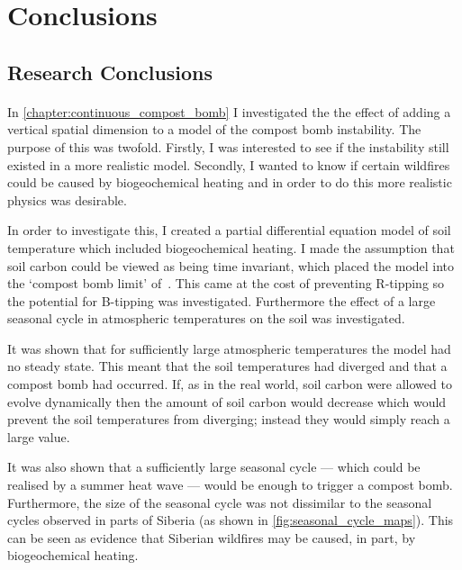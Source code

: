 \chapter{Conclusions}
\graphicspath{{conclusions/figs}}

\section{Research Conclusions}
\subsubsection{}

In \cref{chapter:continuous_compost_bomb} I investigated the the effect of adding a vertical spatial dimension to a model of the compost bomb instability.
The purpose of this was twofold. 
Firstly, I was interested to see if the instability still existed in a more realistic model.
Secondly, I wanted to know if certain wildfires could be caused by biogeochemical heating and in order to do this more realistic physics was desirable.

In order to investigate this, I created a partial differential equation model of soil temperature which included biogeochemical heating. I made the assumption
that soil carbon could be viewed as being time invariant, which placed the model into the `compost bomb limit' of~\cite{Luke2011}. This came at the cost of preventing
R-tipping so the potential for B-tipping was investigated. Furthermore the effect of a large seasonal cycle in atmospheric temperatures on the soil was investigated.

It was shown that for sufficiently large atmospheric temperatures the model had no steady state. This meant that the soil temperatures had diverged and that a compost bomb
had occurred. If, as in the real world, soil carbon were allowed to evolve dynamically then the amount of soil carbon would decrease which would prevent the soil temperatures from diverging;
instead they would simply reach a large value.

It was also shown that a sufficiently large seasonal cycle --- which could be realised by a summer heat wave --- would be enough to trigger a compost bomb.
Furthermore, the size of the seasonal cycle was not dissimilar to the seasonal cycles observed in parts of Siberia (as shown in \cref{fig:seasonal_cycle_maps}).
This can be seen as evidence that Siberian wildfires may be caused, in part, by biogeochemical heating. 

